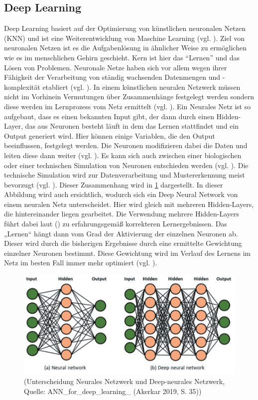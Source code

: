 \subsection{Deep Learning}
Deep Learning basiert auf der Optimierung von künstlichen neuronalen Netzen (KNN) und ist eine Weiterentwicklung von Maschine Learning (vgl. \cite[S. 1]{Georgevici.2019}). Ziel von neuronalen Netzen ist es die Aufgabenlösung in ähnlicher Weise zu ermöglichen wie es im menschlichen Gehirn geschieht. Kern ist hier das “Lernen” und das Lösen von Problemen. Neuronale Netze haben sich vor allem wegen ihrer Fähigkeit der Verarbeitung von ständig wachsenden Datenmengen und -komplexität etabliert (vgl. \cite[S. 373]{Welsch.2018}). In einem künstlichen neuralen Netzwerk müssen nicht im Vorhinein Vermutungen über Zusammenhänge festgelegt werden sondern diese werden im Lernprozess vom Netz ermittelt (vgl. \cite[S. 581]{Backhaus.2018b}). Ein Neurales Netz ist 
so aufgebaut, dass es einen bekannten Input gibt, der dann durch einen Hidden-Layer, das aus Neuronen besteht läuft in dem das Lernen stattfindet und ein Output generiert wird. Hier können einige Variablen, die den Output 
beeinflussen, festgelegt werden. 
Die Neuronen modifizieren dabei die Daten und leiten diese dann weiter (vgl. \cite[S. 373]{Welsch.2018}). Es kann sich auch zwischen einer biologischen oder einer technischen Simulation von Neuronen entschieden werden (vgl. \cite{https:www.facebook.comspektrumverlag.04.12.2014}). Die technische Simulation wird zur Datenverarbeitung und Mustererkennung meist bevorzugt (vgl. \cite{https:www.facebook.comspektrumverlag.04.12.2014}). Dieser Zusammenhang wird in \ref{fig:NeuralVsDeepNeural} dargestellt. 
In dieser Abbildung wird auch ersichtlich, wodurch sich ein Deep Neural Network von einem neuralen Netz unterscheidet. Hier wird gleich mit mehreren Hidden-Layers, die hintereinander liegen gearbeitet. Die Verwendung mehrere Hidden-Layers führt dabei laut (\cite[S. 581]{Backhaus.2018b}) zu erfahrungsgemäß korrekteren Lernergebnissen. Das „Lernen“ hängt dann vom Grad der Aktivierung der einzelnen Neuronen ab. Dieser wird durch die bisherigen Ergebnisse durch eine ermittelte Gewichtung einzelner Neuronen bestimmt. Diese Gewichtung wird im Verlauf des Lernens im Netz im besten Fall immer mehr optimiert (vgl. \cite[S. 586]{Backhaus.2018b}).
\begin{figure}[ht]
\centering
\includegraphics[width=\linewidth]{pics/ANN_for_deep_learning_P35}
\caption{(Unterscheidung Neurales Netzwerk und Deep-neurales Netzwerk, Quelle: ANN_for_deep_learning_ (Akerkar 2019, S. 35))}
\label{fig:NeuralVsDeepNeural}
\end{figure}
